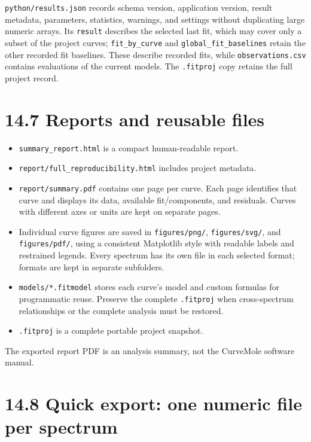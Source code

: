\documentclass[
  10pt,
  a4paper,
  oneside]{scrreprt}
\providecommand{\tightlist}{%
  \setlength{\itemsep}{0pt}\setlength{\parskip}{0pt}}
\begin{document}
\texttt{python/results.json} records schema version, application
version, result metadata, parameters, statistics, warnings, and settings
without duplicating large numeric arrays. Its \texttt{result} describes
the selected last fit, which may cover only a subset of the project
curves; \texttt{fit\_by\_curve} and \texttt{global\_fit\_baselines}
retain the other recorded fit baselines. These describe recorded fits,
while \texttt{observations.csv} contains evaluations of the current
models. The \texttt{.fitproj} copy retains the full project record.

\hypertarget{reports-and-reusable-files}{%
\section{14.7 Reports and reusable
files}\label{reports-and-reusable-files}}

\begin{itemize}
\tightlist
\item
  \texttt{summary\_report.html} is a compact human-readable report.
\item
  \texttt{report/full\_reproducibility.html} includes project metadata.
\item
  \texttt{report/summary.pdf} contains one page per curve. Each page
  identifies that curve and displays its data, available fit/components,
  and residuals. Curves with different axes or units are kept on
  separate pages.
\item
  Individual curve figures are saved in \texttt{figures/png/},
  \texttt{figures/svg/}, and \texttt{figures/pdf/}, using a consistent
  Matplotlib style with readable labels and restrained legends. Every
  spectrum has its own file in each selected format; formats are kept in
  separate subfolders.
\item
  \texttt{models/*.fitmodel} stores each curve's model and custom
  formulas for programmatic reuse. Preserve the complete
  \texttt{.fitproj} when cross-spectrum relationships or the complete
  analysis must be restored.
\item
  \texttt{.fitproj} is a complete portable project snapshot.
\end{itemize}

The exported report PDF is an analysis summary, not the CurveMole
software manual.

\hypertarget{quick-export-one-numeric-file-per-spectrum}{%
\section{14.8 Quick export: one numeric file per
spectrum}\label{quick-export-one-numeric-file-per-spectrum}}
\end{document}

